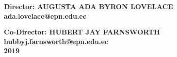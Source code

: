 \begin{titlepage}
\begin{center}
        \textbf{\normalsize{Director: AUGUSTA ADA BYRON LOVELACE}}\\
        \textbf{\normalsize{ada.lovelace@epn.edu.ec}}\\
        
        \vspace*{\baselineskip}
        
        \textbf{\normalsize{Co-Director: HUBERT JAY FARNSWORTH}}\\
        \textbf{\normalsize{hubbyj.farnsworth@epn.edu.ec}}\\
        
        
        \vspace*{\baselineskip}
        \vspace*{\baselineskip}
        \normalsize{\textbf{2019}}
        
    \end{center}
\end{titlepage}